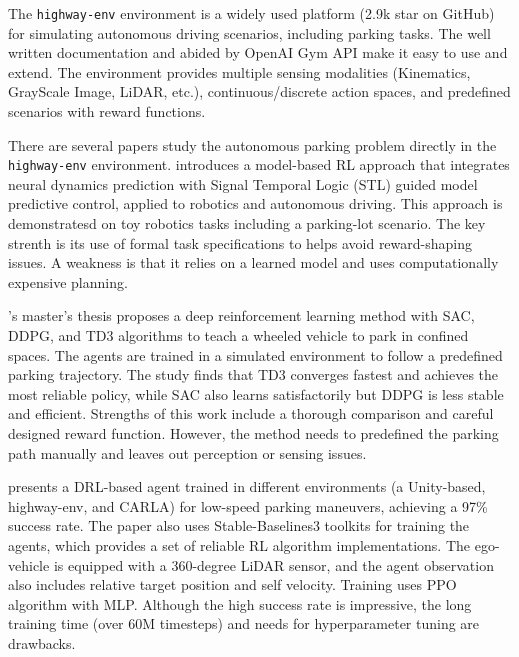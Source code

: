 \documentclass{article}
\begin{document}
The \texttt{highway-env} environment \cite{highway-env} is a widely used platform (2.9k star on GitHub) for simulating autonomous driving scenarios, including parking tasks. The well written documentation and abided by OpenAI Gym API make it easy to use and extend. The environment provides multiple sensing modalities (Kinematics, GrayScale Image, LiDAR, etc.), continuous/discrete action spaces, and predefined scenarios with reward functions.

There are several papers study the autonomous parking problem directly in the \texttt{highway-env} environment. \citet{kapoor2020model} introduces a model-based RL approach that integrates neural dynamics prediction with Signal Temporal Logic (STL) guided model predictive control, applied to robotics and autonomous driving. This approach is demonstratesd on toy robotics tasks including a parking-lot scenario. The key strenth is its use of formal task specifications to helps avoid reward-shaping issues. A weakness is that it relies on a learned model and uses computationally expensive planning.

\citet{moreira2021deep}'s master's thesis proposes a deep reinforcement learning method with SAC, DDPG, and TD3 algorithms to teach a wheeled vehicle to park in confined spaces. The agents are trained in a simulated environment to follow a predefined parking trajectory. The study finds that TD3 converges fastest and achieves the most reliable policy, while SAC also learns satisfactorily but DDPG is less stable and efficient. Strengths of this work include a thorough comparison and careful designed reward function. However, the method needs to predefined the parking path manually and leaves out perception or sensing issues.

\citet{lazzaroni2023automated} presents a DRL-based agent trained in different environments (a Unity-based, highway-env, and CARLA) for low-speed parking maneuvers, achieving a 97\% success rate. The paper also uses Stable-Baselines3 \cite{stable-baselines3} toolkits for training the agents, which provides a set of reliable RL algorithm implementations. The ego-vehicle is equipped with a 360-degree LiDAR sensor, and the agent observation also includes relative target position and self velocity. Training uses PPO algorithm with MLP. Although the high success rate is impressive, the long training time (over 60M timesteps) and needs for hyperparameter tuning are drawbacks.
\end{document}
